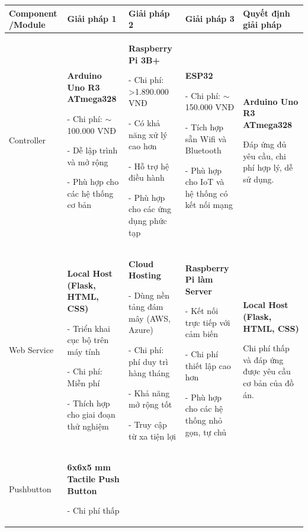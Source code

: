 {{\begin{longtable}{|p{2.3cm}|p{3.2cm}|p{3.2cm}|p{3.2cm}|p{3.5cm}|}
\hline
\textbf{Component /Module} & \textbf{Giải pháp 1} & \textbf{Giải pháp 2} & \textbf{Giải pháp 3} & \textbf{Quyết định giải pháp} \\ \hline
\endhead

\hline
Controller 
& \textbf{Arduino Uno R3 ATmega328}


- Chi phí: $\sim$100.000 VNĐ


- Dễ lập trình và mở rộng


- Phù hợp cho các hệ thống cơ bản & \textbf{Raspberry Pi 3B+}


- Chi phí: \textgreater{}1.890.000 VNĐ


- Có khả năng xử lý cao hơn


- Hỗ trợ hệ điều hành


- Phù hợp cho các ứng dụng phức tạp & \textbf{ESP32}


- Chi phí: $\sim$150.000 VNĐ


- Tích hợp sẵn Wifi và Bluetooth


- Phù hợp cho IoT và hệ thống có kết nối mạng

& \textbf{Arduino Uno R3 ATmega328}


Đáp ứng đủ yêu cầu, chi phí hợp lý, dễ sử dụng. \\ \hline

Web Service 

& \textbf{Local Host (Flask, HTML, CSS)}


- Triển khai cục bộ trên máy tính


- Chi phí: Miễn phí


- Thích hợp cho giai đoạn thử nghiệm & \textbf{Cloud Hosting}


- Dùng nền tảng đám mây (AWS, Azure)


- Chi phí: phí duy trì hàng tháng


- Khả năng mở rộng tốt


- Truy cập từ xa tiện lợi & \textbf{Raspberry Pi làm Server}


- Kết nối trực tiếp với cảm biến


- Chi phí thiết lập cao hơn


- Phù hợp cho các hệ thống nhỏ gọn, tự chủ & \textbf{Local Host (Flask, HTML, CSS)}


Chi phí thấp và đáp ứng được yêu cầu cơ bản của đồ án. \\ \hline

Pushbutton 

& \textbf{6x6x5 mm Tactile Push Button}


- Chi phí thấp



\end{longtable}}}
